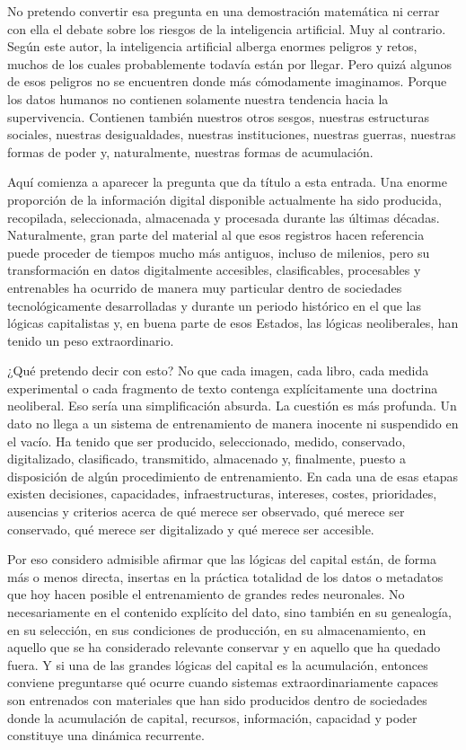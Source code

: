 \documentclass[12pt,a4paper]{article}
\begin{document}
No pretendo convertir esa pregunta en una demostración matemática ni cerrar con ella el debate sobre los riesgos de la inteligencia artificial. Muy al contrario. Según este autor, la inteligencia artificial alberga enormes peligros y retos, muchos de los cuales probablemente todavía están por llegar. Pero quizá algunos de esos peligros no se encuentren donde más cómodamente imaginamos. Porque los datos humanos no contienen solamente nuestra tendencia hacia la supervivencia. Contienen también nuestros otros sesgos, nuestras estructuras sociales, nuestras desigualdades, nuestras instituciones, nuestras guerras, nuestras formas de poder y, naturalmente, nuestras formas de acumulación.

Aquí comienza a aparecer la pregunta que da título a esta entrada. Una enorme proporción de la información digital disponible actualmente ha sido producida, recopilada, seleccionada, almacenada y procesada durante las últimas décadas. Naturalmente, gran parte del material al que esos registros hacen referencia puede proceder de tiempos mucho más antiguos, incluso de milenios, pero su transformación en datos digitalmente accesibles, clasificables, procesables y entrenables ha ocurrido de manera muy particular dentro de sociedades tecnológicamente desarrolladas y durante un periodo histórico en el que las lógicas capitalistas y, en buena parte de esos Estados, las lógicas neoliberales, han tenido un peso extraordinario.

¿Qué pretendo decir con esto? No que cada imagen, cada libro, cada medida experimental o cada fragmento de texto contenga explícitamente una doctrina neoliberal. Eso sería una simplificación absurda. La cuestión es más profunda. Un dato no llega a un sistema de entrenamiento de manera inocente ni suspendido en el vacío. Ha tenido que ser producido, seleccionado, medido, conservado, digitalizado, clasificado, transmitido, almacenado y, finalmente, puesto a disposición de algún procedimiento de entrenamiento. En cada una de esas etapas existen decisiones, capacidades, infraestructuras, intereses, costes, prioridades, ausencias y criterios acerca de qué merece ser observado, qué merece ser conservado, qué merece ser digitalizado y qué merece ser accesible.

Por eso considero admisible afirmar que las lógicas del capital están, de forma más o menos directa, insertas en la práctica totalidad de los datos o metadatos que hoy hacen posible el entrenamiento de grandes redes neuronales. No necesariamente en el contenido explícito del dato, sino también en su genealogía, en su selección, en sus condiciones de producción, en su almacenamiento, en aquello que se ha considerado relevante conservar y en aquello que ha quedado fuera. Y si una de las grandes lógicas del capital es la acumulación, entonces conviene preguntarse qué ocurre cuando sistemas extraordinariamente capaces son entrenados con materiales que han sido producidos dentro de sociedades donde la acumulación de capital, recursos, información, capacidad y poder constituye una dinámica recurrente.
\end{document}
